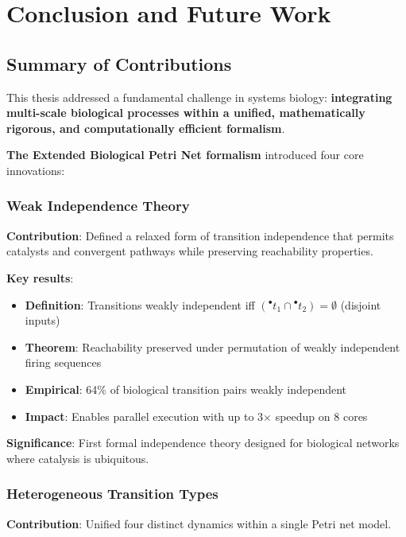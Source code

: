 \chapter{Conclusion and Future Work}
\label{ch:conclusion}

\section{Summary of Contributions}
\label{sec:summary-contributions}

This thesis addressed a fundamental challenge in systems biology: \textbf{integrating multi-scale biological processes within a unified, mathematically rigorous, and computationally efficient formalism}.

\textbf{The Extended Biological Petri Net formalism} introduced four core innovations:

\subsection{Weak Independence Theory}
\label{subsec:weak-indep-summary}

\textbf{Contribution}: Defined a relaxed form of transition independence that permits catalysts and convergent pathways while preserving reachability properties.

\textbf{Key results}:
\begin{itemize}
    \item \textbf{Definition}: Transitions weakly independent iff $({}^\bullet t_1 \cap {}^\bullet t_2) = \emptyset$ (disjoint inputs)
    \item \textbf{Theorem}: Reachability preserved under permutation of weakly independent firing sequences
    \item \textbf{Empirical}: 64\% of biological transition pairs weakly independent
    \item \textbf{Impact}: Enables parallel execution with up to 3$\times$ speedup on 8 cores
\end{itemize}

\textbf{Significance}: First formal independence theory designed for biological networks where catalysis is ubiquitous.

\subsection{Heterogeneous Transition Types}
\label{subsec:hetero-summary}

\textbf{Contribution}: Unified four distinct dynamics within a single Petri net model.

